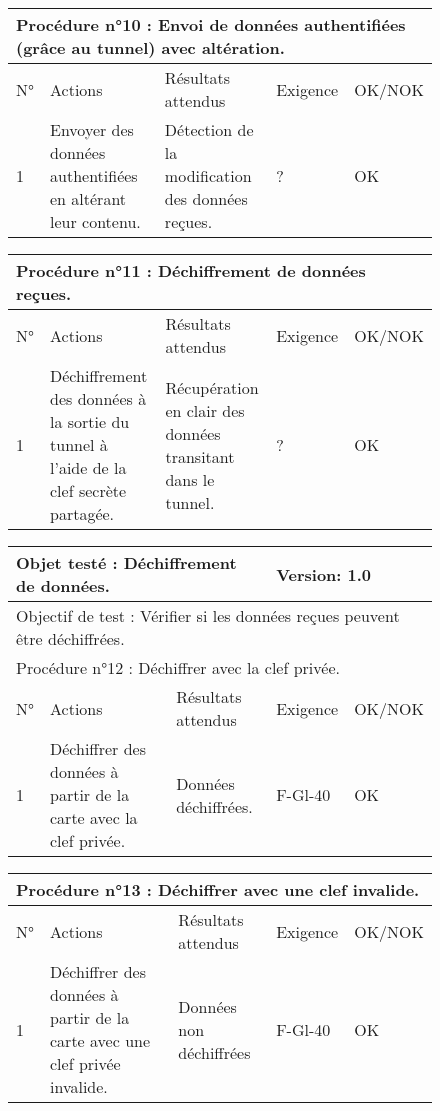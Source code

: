 \documentclass[a4paper,11pt,french]{article}
\begin{document}
\begin{figure}[!h]
\begin{tabular}{|p{1cm}|p{5cm}|p{5cm}|p{2cm}|p{2cm}|}
\hline
\multicolumn{5}{|l|}{Procédure n°10 : Envoi de données authentifiées (grâce au tunnel) avec altération.} \\
\hline
N° & Actions & Résultats attendus & Exigence & OK/NOK \\
\hline
1 & Envoyer des données authentifiées en altérant leur contenu. & Détection de la modification des données reçues. & ? & OK \\
\hline
\end{tabular}
\end{figure}


\begin{figure}[!h]
\begin{tabular}{|p{1cm}|p{5cm}|p{5cm}|p{2cm}|p{2cm}|}
\hline
\multicolumn{5}{|l|}{Procédure n°11 : Déchiffrement de données reçues.} \\
\hline
N° & Actions & Résultats attendus & Exigence & OK/NOK \\
\hline
1 & Déchiffrement des données à la sortie du tunnel à l'aide de la clef secrète partagée. & Récupération en clair des données transitant dans le tunnel. & ? & OK \\
\hline
\end{tabular}
\end{figure}


\begin{figure}[!h]
\begin{tabular}{|p{1cm}|p{5cm}|p{5cm}|p{2cm}|p{2cm}|}
\hline
\multicolumn{3}{|l|}{Objet testé : Déchiffrement de données.} & \multicolumn{2}{|l|}{Version: 1.0} \\
\hline
\multicolumn{5}{|l|}{Objectif de test : Vérifier si les données reçues peuvent être déchiffrées.} \\
\hline
\multicolumn{5}{|l|}{Procédure n°12 : Déchiffrer avec la clef privée.} \\
\hline
N° & Actions & Résultats attendus & Exigence & OK/NOK \\
\hline
1 & Déchiffrer des données à partir de la carte avec la clef privée. & Données déchiffrées. & F-Gl-40 & OK \\
\hline
\end{tabular}
\end{figure}



\begin{figure}[!h]
\begin{tabular}{|p{1cm}|p{5cm}|p{5cm}|p{2cm}|p{2cm}|}
\hline
\multicolumn{5}{|l|}{Procédure n°13 : Déchiffrer avec une clef invalide.} \\
\hline
N° & Actions & Résultats attendus & Exigence & OK/NOK \\
\hline
1 & Déchiffrer des données à partir de la carte avec une clef privée invalide. & Données non déchiffrées & F-Gl-40 & OK \\
\hline
\end{tabular}
\end{figure}
\end{document}
